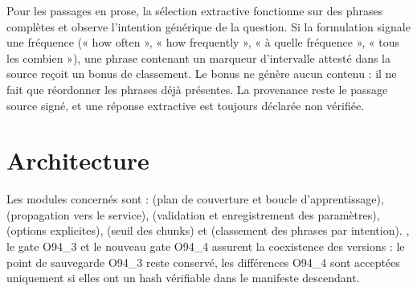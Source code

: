\documentclass[11pt,a4paper]{article}
\begin{document}
Pour les passages en prose, la sélection extractive fonctionne sur des phrases complètes et observe l'intention générique de la question. Si la formulation signale une fréquence (« how often », « how frequently », « à quelle fréquence », « tous les combien »), une phrase contenant un marqueur d'intervalle attesté dans la source reçoit un bonus de classement. Le bonus ne génère aucun contenu : il ne fait que réordonner les phrases déjà présentes. La provenance reste le passage source signé, et une réponse extractive est toujours déclarée non vérifiée.

\section{Architecture}
\begin{center}
\end{center}

Les modules concernés sont : \texttt{} (plan de couverture et boucle d'apprentissage), \texttt{} (propagation vers le service), \texttt{} (validation et enregistrement des paramètres), \texttt{} (options explicites), \texttt{} (seuil des chunks) et \texttt{} (classement des phrases par intention). \texttt{}, le gate O94\_3 et le nouveau gate O94\_4 assurent la coexistence des versions : le point de sauvegarde O94\_3 reste conservé, les différences O94\_4 sont acceptées uniquement si elles ont un hash vérifiable dans le manifeste descendant.
\end{document}
